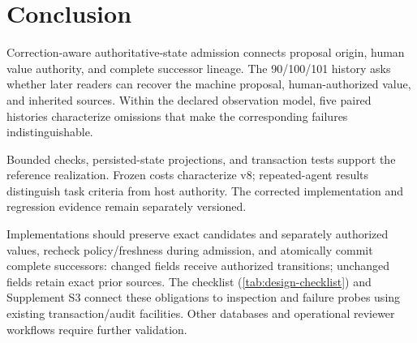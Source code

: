 \section{Conclusion}
\label{sec:conclusion}

Correction-aware authoritative-state admission connects proposal origin, human value authority, and complete successor lineage. The 90/100/101 history asks whether later readers can recover the machine proposal, human-authorized value, and inherited sources. Within the declared observation model, five paired histories characterize omissions that make the corresponding failures indistinguishable.

Bounded checks, persisted-state projections, and transaction tests support the reference realization. Frozen costs characterize v8; repeated-agent results distinguish task criteria from host authority. The corrected implementation and regression evidence remain separately versioned.

Implementations should preserve exact candidates and separately authorized values, recheck policy/freshness during admission, and atomically commit complete successors: changed fields receive authorized transitions; unchanged fields retain exact prior sources. The checklist (\cref{tab:design-checklist}) and Supplement S3 connect these obligations to inspection and failure probes using existing transaction/audit facilities. Other databases and operational reviewer workflows require further validation.